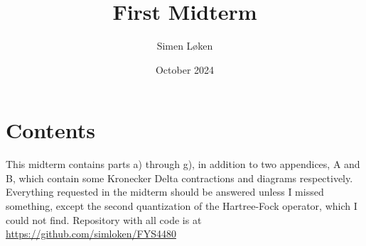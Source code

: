 \documentclass{article}
\title{First Midterm}
\author{Simen Løken}
\date{October 2024}
\begin{document}
\maketitle
\renewcommand{\thesection}{Part \alph{section}}
\renewcommand{\thesubsection}{\alph{subsection})}

\section*{Contents}
This midterm contains parts a) through g), in addition to two appendices, A and B, which contain some Kronecker Delta contractions and diagrams respectively. Everything requested in the midterm should be answered unless I missed something, except the second quantization of the Hartree-Fock operator, which I could not find.
\newline
Repository with all code is at \href{https://github.com/simloken/FYS4480}{https://github.com/simloken/FYS4480}
\end{document}
